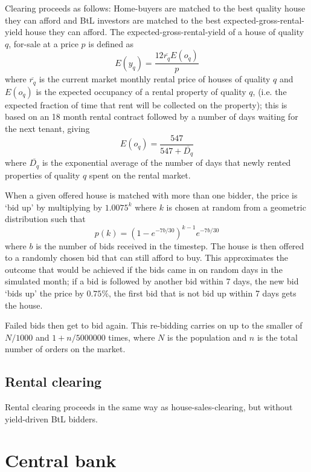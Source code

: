 \documentclass{report}
\begin{document}
Clearing proceeds as follows: Home-buyers are matched to the best quality
house they can afford and BtL investors are matched to the best expected-gross-rental-yield house they can afford. The expected-gross-rental-yield of a house of quality $q$, for-sale at a price $p$ is defined as
\begin{equation}
E(y_q) = \frac{12\overline{r_q}E(o_q)}{p}
\end{equation}
where $\overline{r_q}$ is the current market monthly rental price of houses of quality $q$ and $E(o_q)$ is the expected occupancy of a rental property of quality $q$, (i.e. the expected fraction of time that rent will be collected on the property); this is based on an 18 month rental contract followed by a number of days waiting for the next tenant, giving
\begin{equation}
E(o_q) = \frac{547}{547+\overline{D_q}}
\end{equation}
where $\overline{D_q}$ is the exponential average of the number of days that newly rented properties of quality $q$ spent on the rental market.

When a given offered house is matched with more than one bidder, the price is `bid up' by multiplying by $1.0075^k$ where $k$ is chosen at random from a geometric distribution such that
\begin{equation}
p(k) = (1-e^{-7b/30})^{k-1}e^{-7b/30}
\end{equation}
where $b$ is the number of bids received in the timestep. The house is then offered to a randomly chosen bid that can still afford to buy. This approximates the outcome that would be achieved if the bids came in on random days in the simulated month; if a bid is followed by another bid within 7 days, the new bid `bids up' the price by $0.75\%$, the first bid that is not bid up within 7 days gets the house.

Failed bids then get to bid again. This re-bidding carries on up to the smaller of $N/1000$ and $1+n/5000000$ times, where $N$ is the population and $n$ is the total number of orders on the market.

\subsection{Rental clearing}

Rental clearing proceeds in the same way as house-sales-clearing, but
without yield-driven BtL bidders.\bigskip

\section{Central bank}
\end{document}
